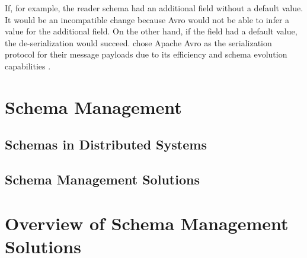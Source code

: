 If, for example, the reader schema had an additional field without a default value.
It would be an incompatible change because Avro would not be able to infer a value for the additional field.
On the other hand, if the field had a default value, the de-serialization would succeed.
\citeauthor{kreps_kafka_2011} chose Apache Avro as the serialization protocol for their message payloads due to its efficiency and schema evolution capabilities \parencite{kreps_kafka_2011}. 

\section{Schema Management}

\subsection{Schemas in Distributed Systems}

\subsection{Schema Management Solutions}

\section{Overview of Schema Management Solutions}
